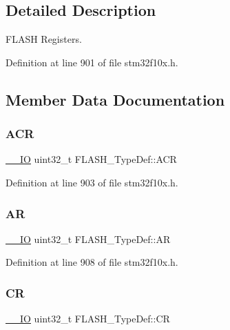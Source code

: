 \subsection{Detailed Description}
F\+L\+A\+SH Registers. 

Definition at line 901 of file stm32f10x.\+h.



\subsection{Member Data Documentation}
\mbox{\label{struct_f_l_a_s_h___type_def_aaf432a8a8948613f4f66fcace5d2e5fe}} 
\subsubsection{\texorpdfstring{A\+CR}{ACR}}
{\footnotesize\ttfamily \hyperlink{core__sc300_8h_aec43007d9998a0a0e01faede4133d6be}{\+\_\+\+\_\+\+IO} uint32\+\_\+t F\+L\+A\+S\+H\+\_\+\+Type\+Def\+::\+A\+CR}



Definition at line 903 of file stm32f10x.\+h.

\mbox{\label{struct_f_l_a_s_h___type_def_a9cd77bc29038841798b4b63c5cecdb9d}} 
\subsubsection{\texorpdfstring{AR}{AR}}
{\footnotesize\ttfamily \hyperlink{core__sc300_8h_aec43007d9998a0a0e01faede4133d6be}{\+\_\+\+\_\+\+IO} uint32\+\_\+t F\+L\+A\+S\+H\+\_\+\+Type\+Def\+::\+AR}



Definition at line 908 of file stm32f10x.\+h.

\mbox{\label{struct_f_l_a_s_h___type_def_a7919306d0e032a855200420a57f884d7}} 
\subsubsection{\texorpdfstring{CR}{CR}}
{\footnotesize\ttfamily \hyperlink{core__sc300_8h_aec43007d9998a0a0e01faede4133d6be}{\+\_\+\+\_\+\+IO} uint32\+\_\+t F\+L\+A\+S\+H\+\_\+\+Type\+Def\+::\+CR}



